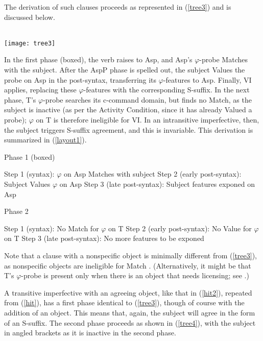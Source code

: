 \documentclass[output=paper
,modfonts
,nonflat]{langsci/langscibook}
\begin{document}
\z

\noindent The derivation of such clauses proceeds as represented in (\ref{tree3}) and is discussed below.


\ea \label{tree3} \- \\ \texttt{[image: tree3]}
\z

\noindent In the first phase (boxed), the verb raises to Asp, and Asp's $\varphi$-probe Matches with the subject. After the AspP phase is spelled out, the subject Values the probe on Asp in the post-syntax, transferring its $\varphi$-features to Asp. Finally, VI applies, replacing these $\varphi$-features with the corresponding S-suffix. In the next phase, T's $\varphi$-probe searches its c-command domain, but finds no Match, as the subject is inactive (as per the Activity Condition, since it has already Valued a probe); $\varphi$ on T is therefore ineligible for VI. In an intransitive imperfective, then, the subject triggers S-suffix agreement, and this is invariable. This derivation is summarized in (\ref{layout1}).

\eal \label{layout1}
\ex Phase 1 (boxed)
\begin{xlist}
\ex Step 1 (syntax): $\varphi$ on Asp Matches with subject
\ex Step 2 (early post-syntax): Subject Values $\varphi$ on Asp
\ex Step 3 (late post-syntax): Subject features exponed on Asp
\end{xlist}
\ex Phase 2
\begin{xlist}
\ex Step 1 (syntax): No Match for $\varphi$ on T
\ex Step 2 (early post-syntax): No Value for $\varphi$ on T
\ex Step 3 (late post-syntax): No more features to be exponed
\end{xlist}
\zl

\noindent Note that a clause with a nonspecific object is minimally different from (\ref{tree3}), as nonspecific objects are ineligible for Match \citep{KalinvanUrk15}. (Alternatively, it might be that T's $\varphi$-probe is present only when there is an object that needs licensing; see \citealt{KalinTA}.)

A transitive imperfective with an agreeing object, like that in (\ref{hit2}), repeated from (\ref{hit}), has a first phase identical to (\ref{tree3}), though of course with the addition of an object. This means that, again, the subject will agree in the form of an S-suffix. The second phase proceeds as shown in (\ref{tree4}), with the subject in angled brackets as it is inactive in the second phase.
\end{document}
